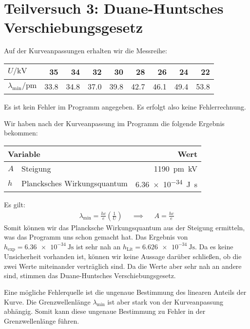 \newpage
\section{Teilversuch 3: Duane-Huntsches Verschiebungsgesetz}
	Auf der Kurveanpassungen erhalten wir die Messreihe:
	\begin{center}
		\vspace{\parskip}
		\begin{tabular}{l*{8}{r}}
		\toprule
			$U/\si{\kilo\volt}$ & \num{35} & \num{34} & \num{32} & \num{30} & \num{28} & \num{26} & \num{24} & \num{22} \\
		\midrule
			$\lambda_\text{min}/\si{\pico\meter}$ & \num{33.8} & \num{34.8} & \num{37.0} & \num{39.8} & \num{42.7} & \num{46.1} & \num{49.4} & \num{53.8} \\
		\bottomrule			
		\end{tabular}
		\vspace{\parskip}
	\end{center}
	Es ist kein Fehler im Programm angegeben. Es erfolgt also keine Fehlerrechnung.

	Wir haben nach der Kurveanpassung im Programm die folgende Ergebnis bekommen:
	\begin{center}
		\begin{tabular}{llr}
			\toprule
			\multicolumn{2}{l}{Variable} & Wert \\
			\midrule
			$A$	& Steigung& \SI{1190}{\pico\meter\kilo\volt} \\
			$h$	& Plancksches Wirkungsquantum & \SI{6.36e-34}{\joule\second} \\
			\bottomrule 
		\end{tabular}
	\end{center}
	Es gilt:
	\begin{align}
		\lambda_\text{min} = \frac{hc}{e}\left(\frac{1}{U}\right) &&\implies&& A = \frac{hc}{e}
	\end{align}
	Somit können wir das Plancksche Wirkungsquantum aus der Steigung ermitteln, was das Programm uns schon gemacht hat. Das Ergebnis von $h_\text{exp} = \SI{6.36e-34}{\joule\second}$ ist sehr nah an $h_\text{Lit} = \SI{6.626e-34}{\joule\second}$. Da es keine Unsicherheit vorhanden ist, können wir keine Aussage darüber schließen, ob die zwei Werte miteinander verträglich sind. Da die Werte aber sehr nah an andere sind, stimmen das Duane-Huntsches Verschiebungsgesetz. 

	Eine mögliche Fehlerquelle ist die ungenaue Bestimmung des linearen Anteils der Kurve. Die Grenzwellenlänge $\lambda_\text{min}$ ist aber stark von der Kurveanpassung abhängig. Somit kann diese ungenaue Bestimmung zu Fehler in der Grenzwellenlänge führen.

